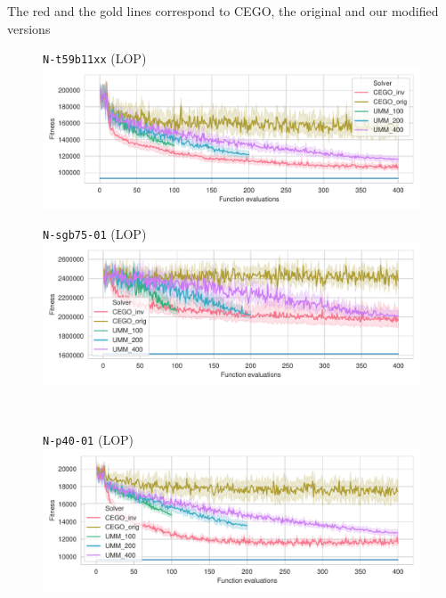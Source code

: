 \documentclass[sigconf,dvipsnames]{acmart}
\begin{document}
The red and the gold lines correspond to CEGO, the original and our modified versions

\begin{figure}[tb]
\small
\centering%
\begin{minipage}{0.49\linewidth}
  \texttt{N-t59b11xx} (LOP)\\[-0.5ex]
  \includegraphics[width=\textwidth]{../img/fitness_lop_IO_N-t59b11xx}
\end{minipage}
\begin{minipage}{0.49\linewidth}
  \texttt{N-sgb75-01} (LOP)\\[-0.5ex]
  \includegraphics[width=\textwidth]{../img/fitness_lop_SGB_N-sgb75_02}
\end{minipage}
\\
\begin{minipage}{0.49\linewidth}
  \texttt{N-p40-01} (LOP)\\[-0.5ex]
  \includegraphics[width=\textwidth]{../img/fitness_lop_RandB_N-p40-01}
\end{minipage}

\end{figure}
\end{document}
